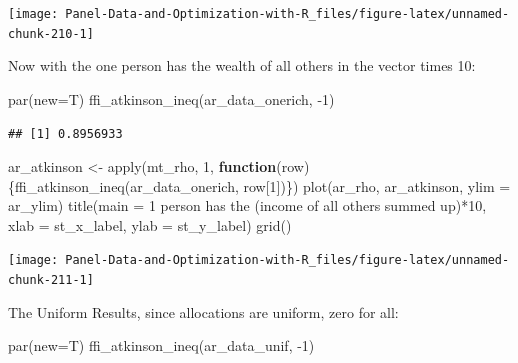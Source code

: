 \documentclass[
]{book}
\newenvironment{Shaded}{\begin{snugshade}}{\end{snugshade}}
\newcommand{\AttributeTok}[1]{\textcolor[rgb]{0.77,0.63,0.00}{#1}}
\newcommand{\ControlFlowTok}[1]{\textcolor[rgb]{0.13,0.29,0.53}{\textbf{#1}}}
\newcommand{\DecValTok}[1]{\textcolor[rgb]{0.00,0.00,0.81}{#1}}
\newcommand{\FunctionTok}[1]{\textcolor[rgb]{0.00,0.00,0.00}{#1}}
\newcommand{\NormalTok}[1]{#1}
\newcommand{\OtherTok}[1]{\textcolor[rgb]{0.56,0.35,0.01}{#1}}
\newcommand{\SpecialCharTok}[1]{\textcolor[rgb]{0.00,0.00,0.00}{#1}}
\newcommand{\StringTok}[1]{\textcolor[rgb]{0.31,0.60,0.02}{#1}}
\begin{document}
\begin{center}\texttt{[image: Panel-Data-and-Optimization-with-R\_files/figure-latex/unnamed-chunk-210-1]} \end{center}

Now with the one person has the wealth of all others in the vector times 10:

\begin{Shaded}
\begin{Highlighting}[]
\FunctionTok{par}\NormalTok{(}\AttributeTok{new=}\NormalTok{T)}
\FunctionTok{ffi\_atkinson\_ineq}\NormalTok{(ar\_data\_onerich, }\SpecialCharTok{{-}}\DecValTok{1}\NormalTok{)}
\end{Highlighting}
\end{Shaded}

\begin{verbatim}
## [1] 0.8956933
\end{verbatim}

\begin{Shaded}
\begin{Highlighting}[]
\NormalTok{ar\_atkinson }\OtherTok{\textless{}{-}} \FunctionTok{apply}\NormalTok{(mt\_rho, }\DecValTok{1}\NormalTok{, }\ControlFlowTok{function}\NormalTok{(row)\{}\FunctionTok{ffi\_atkinson\_ineq}\NormalTok{(ar\_data\_onerich, row[}\DecValTok{1}\NormalTok{])\})}
\FunctionTok{plot}\NormalTok{(ar\_rho, ar\_atkinson, }\AttributeTok{ylim =}\NormalTok{ ar\_ylim)}
\FunctionTok{title}\NormalTok{(}\AttributeTok{main =} \StringTok{\textquotesingle{}1 person has the (income of all others summed up)*10\textquotesingle{}}\NormalTok{, }\AttributeTok{xlab =}\NormalTok{ st\_x\_label, }\AttributeTok{ylab =}\NormalTok{ st\_y\_label)}
\FunctionTok{grid}\NormalTok{()}
\end{Highlighting}
\end{Shaded}

\begin{center}\texttt{[image: Panel-Data-and-Optimization-with-R\_files/figure-latex/unnamed-chunk-211-1]} \end{center}

The Uniform Results, since allocations are uniform, zero for all:

\begin{Shaded}
\begin{Highlighting}[]
\FunctionTok{par}\NormalTok{(}\AttributeTok{new=}\NormalTok{T)}
\FunctionTok{ffi\_atkinson\_ineq}\NormalTok{(ar\_data\_unif, }\SpecialCharTok{{-}}\DecValTok{1}\NormalTok{)}
\end{Highlighting}
\end{Shaded}
\end{document}
